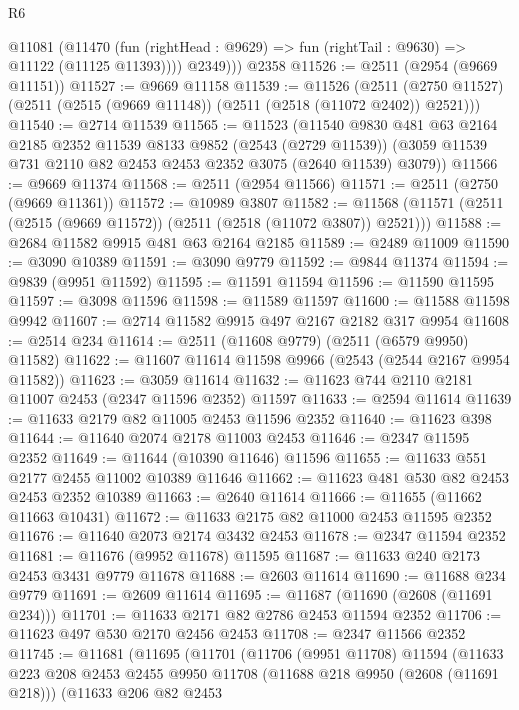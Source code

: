 \begin{lexlean}{R6}
\begin{coremodule}
        @11081
          (@11470 (fun (rightHead : @9629) => fun (rightTail : @9630) => @11122 (@11125 @11393))))
          @2349)))
    @2358
@11526 := @2511 (@2954 (@9669 @11151))
@11527 := @9669 @11158
@11539 := @11526
    (@2511 (@2750 @11527) (@2511 (@2515 (@9669 @11148)) (@2511 (@2518 (@11072 @2402)) @2521)))
@11540 := @2714 @11539
@11565 := @11523
    (@11540
      @9830
      @481
      @63
      @2164
      @2185
      @2352
      @11539
      @8133
      @9852
      (@2543 (@2729 @11539))
      (@3059 @11539 @731 @2110 @82 @2453 @2453 @2352 @3075 (@2640 @11539) @3079))
@11566 := @9669 @11374
@11568 := @2511 (@2954 @11566)
@11571 := @2511 (@2750 (@9669 @11361))
@11572 := @10989 @3807
@11582 := @11568 (@11571 (@2511 (@2515 (@9669 @11572)) (@2511 (@2518 (@11072 @3807)) @2521)))
@11588 := @2684 @11582 @9915 @481 @63 @2164 @2185
@11589 := @2489 @11009
@11590 := @3090 @10389
@11591 := @3090 @9779
@11592 := @9844 @11374
@11594 := @9839 (@9951 @11592)
@11595 := @11591 @11594
@11596 := @11590 @11595
@11597 := @3098 @11596
@11598 := @11589 @11597
@11600 := @11588 @11598 @9942
@11607 := @2714 @11582 @9915 @497 @2167 @2182 @317 @9954
@11608 := @2514 @234
@11614 := @2511 (@11608 @9779) (@2511 (@6579 @9950) @11582)
@11622 := @11607 @11614 @11598 @9966 (@2543 (@2544 @2167 @9954 @11582))
@11623 := @3059 @11614
@11632 := @11623 @744 @2110 @2181 @11007 @2453 (@2347 @11596 @2352) @11597
@11633 := @2594 @11614
@11639 := @11633 @2179 @82 @11005 @2453 @11596 @2352
@11640 := @11623 @398
@11644 := @11640 @2074 @2178 @11003 @2453
@11646 := @2347 @11595 @2352
@11649 := @11644 (@10390 @11646) @11596
@11655 := @11633 @551 @2177 @2455 @11002 @10389 @11646
@11662 := @11623 @481 @530 @82 @2453 @2453 @2352 @10389
@11663 := @2640 @11614
@11666 := @11655 (@11662 @11663 @10431)
@11672 := @11633 @2175 @82 @11000 @2453 @11595 @2352
@11676 := @11640 @2073 @2174 @3432 @2453
@11678 := @2347 @11594 @2352
@11681 := @11676 (@9952 @11678) @11595
@11687 := @11633 @240 @2173 @2453 @3431 @9779 @11678
@11688 := @2603 @11614
@11690 := @11688 @234 @9779
@11691 := @2609 @11614
@11695 := @11687 (@11690 (@2608 (@11691 @234)))
@11701 := @11633 @2171 @82 @2786 @2453 @11594 @2352
@11706 := @11623 @497 @530 @2170 @2456 @2453
@11708 := @2347 @11566 @2352
@11745 := @11681
    (@11695
      (@11701
        (@11706
          (@9951 @11708)
          @11594
          (@11633
            @223
            @208
            @2453
            @2455
            @9950
            @11708
            (@11688 @218 @9950 (@2608 (@11691 @218)))
            (@11633
              @206
              @82
              @2453

\end{coremodule}
\end{lexlean}
